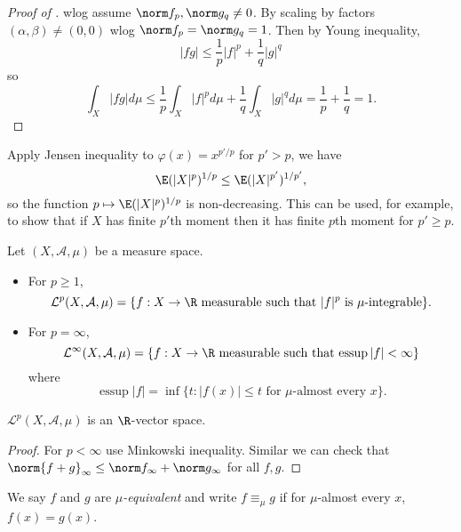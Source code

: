 \documentclass[a4paper]{article}
\DeclareMathOperator{\essup}{essup} %
\begin{document}
\begin{proof}[Proof of ]
  wlog assume \(\norm f_p, \norm g_q \neq 0\). By scaling by factors \((\alpha, \beta) \neq (0, 0)\) wlog \(\norm f_p = \norm g_q = 1\). Then by Young inequality,
  \[
    |fg| \leq \frac{1}{p} |f|^p + \frac{1}{q} |g|^q
  \]
  so
  \[
    \int_X |fg| d\mu \leq \frac{1}{p} \int_X |f|^p d\mu + \frac{1}{q} \int_X |g|^q d\mu = \frac{1}{p} + \frac{1}{q} = 1.
  \]
\end{proof}

\begin{remark}
  Apply Jensen inequality to \(\varphi(x) = x^{p'/p}\) for \(p' > p\), we have
  \[
    \E(|X|^p)^{1/p} \leq \E(|X|^{p'})^{1/p'},
  \]
  so the function \(p \mapsto \E(|X|^p)^{1/p}\) is non-decreasing. This can be used, for example, to show that if \(X\) has finite \(p'\)th moment then it has finite \(p\)th moment for \(p' \geq p\).
\end{remark}

\begin{definition}
  Let \((X, \mathcal A, \mu)\) be a measure space.
  \begin{itemize}
  \item For \(p \geq 1\),
    \[
      \mathcal L^p(X, \mathcal A, \mu) = \{f: X \to \R \text{ measurable such that \(|f|^p\) is \(\mu\)-integrable}\}.
    \]
  \item For \(p = \infty\),
    \[
      \mathcal L^\infty(X, \mathcal A, \mu) = \{f: X \to \R \text{ measurable such that \(\essup |f| < \infty\)}\}
    \]
    where
    \[
      \essup |f| = \inf \{t: |f(x)| \leq t \text{ for \(\mu\)-almost every } x\}.
    \]
  \end{itemize}
\end{definition}

\begin{lemma}
  \(\mathcal L^p(X, \mathcal A, \mu)\) is an \(\R\)-vector space.
\end{lemma}

\begin{proof}
  For \(p < \infty\) use Minkowski inequality. Similar we can check that \(\norm{f + g}_\infty \leq \norm f_\infty + \norm g_\infty\) for all \(f, g\).
\end{proof}

\begin{definition}
  We say \(f\) and \(g\) are \emph{\(\mu\)-equivalent} and write \(f \equiv_\mu g\) if for \(\mu\)-almost every \(x\), \(f(x) = g(x)\).
\end{definition}
\end{document}
